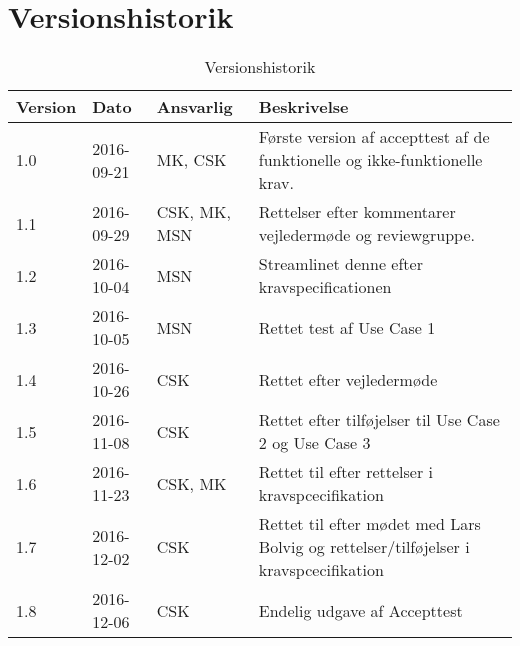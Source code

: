 \chapter{Versionshistorik}\label{Versionshistorik}

\begin{table}[htb]
\begin{tabular}{ | l | l | l | p{} | }
\hline
\textbf{Version} & \textbf{Dato} & \textbf{Ansvarlig} & \textbf{Beskrivelse} \\\hline
1.0 & 2016-09-21 & MK, CSK & Første version af accepttest af de funktionelle og ikke-funktionelle krav.\\\hline
1.1 & 2016-09-29 & CSK, MK, MSN & Rettelser efter kommentarer vejledermøde og reviewgruppe. \\\hline
1.2 & 2016-10-04 & MSN & Streamlinet denne efter kravspecificationen \\\hline
1.3 & 2016-10-05 & MSN & Rettet test af Use Case 1 \\\hline
1.4 & 2016-10-26 & CSK & Rettet efter vejledermøde \\\hline
1.5 & 2016-11-08 & CSK & Rettet efter tilføjelser til Use Case 2 og Use Case 3 \\\hline
1.6 & 2016-11-23 & CSK, MK & Rettet til efter rettelser i kravspcecifikation \\\hline
1.7 & 2016-12-02 & CSK & Rettet til efter mødet med Lars Bolvig og rettelser/tilføjelser i kravspcecifikation \\\hline
1.8 & 2016-12-06 & CSK & Endelig udgave af Accepttest \\\hline
\end{tabular}
\caption{Versionshistorik}
\end{table}
\newpage 